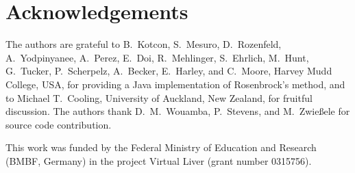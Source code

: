 \documentclass[10pt]{bmc_article}
\newenvironment{bmcformat}{\baselineskip20pt\sloppy\setboolean{publ}{false}}{\baselineskip20pt\sloppy}
\begin{document}
\begin{bmcformat}
\section*{Acknowledgements}
The authors are grateful to B.~Kotcon, S.~Mesuro, D.~Rozenfeld, A.~Yodpinyanee,
A.~Perez, E.~Doi, R.~Mehlinger, S.~Ehrlich, M.~Hunt, G.~Tucker, P.~Scherpelz,
A.~Becker, E.~Harley, and C.~Moore, Harvey Mudd College, USA, for providing a
Java implementation of Rosenbrock's method, and to Michael T.~Cooling,
University of Auckland, New Zealand, for fruitful discussion. The authors thank
D.~M.~Wouamba, P.~Stevens, and M.~Zwie\ss{}ele for source code contribution.

This work was funded by the Federal Ministry of Education and Research (BMBF,
Germany) in the project Virtual Liver (grant number 0315756).
 

\newpage
{
   }     %





\end{bmcformat}
\end{document}
